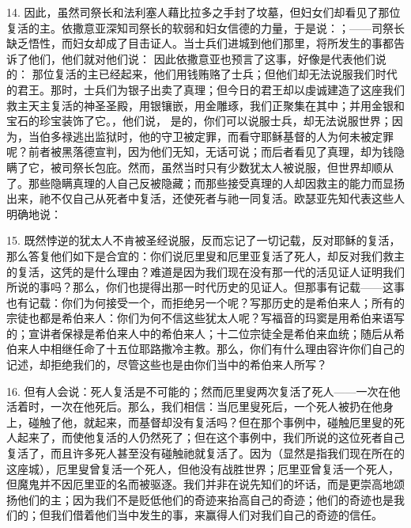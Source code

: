 14. 因此，虽然司祭长和法利塞人藉比拉多之手封了坟墓，但妇女们却看见了那位复活的主。依撒意亚深知司祭长的软弱和妇女信德的力量，于是说：；——司祭长缺乏悟性，而妇女却成了目击证人。当士兵们进城到他们那里，将所发生的事都告诉了他们，他们就对他们说： 因此依撒意亚也预言了这事，好像是代表他们说的： 那位复活的主已经起来，他们用钱贿赂了士兵；但他们却无法说服我们时代的君王。那时，士兵们为银子出卖了真理；但今日的君王却以虔诚建造了这座我们救主天主复活的神圣圣殿，用银镶嵌，用金雕琢，我们正聚集在其中；并用金银和宝石的珍宝装饰了它。，他们说， 是的，你们可以说服士兵，却无法说服世界；因为，当伯多禄逃出监狱时，他的守卫被定罪，而看守耶稣基督的人为何未被定罪呢？前者被黑落德宣判，因为他们无知，无话可说；而后者看见了真理，却为钱隐瞒了它，被司祭长包庇。然而，虽然当时只有少数犹太人被说服，但世界却顺从了。那些隐瞒真理的人自己反被隐藏；而那些接受真理的人却因救主的能力而显扬出来，祂不仅自己从死者中复活，还使死者与祂一同复活。欧瑟亚先知代表这些人明确地说：\par

15. 既然悖逆的犹太人不肯被圣经说服，反而忘记了一切记载，反对耶稣的复活，那么答复他们如下是合宜的：你们说厄里叟和厄里亚复活了死人，却反对我们救主的复活，这凭的是什么理由？难道是因为我们现在没有那一代的活见证人证明我们所说的事吗？那么，你们也提得出那一时代历史的见证人。但那事有记载——这事也有记载：你们为何接受一个，而拒绝另一个呢？写那历史的是希伯来人；所有的宗徒也都是希伯来人：你们为何不信这些犹太人呢？写福音的玛窦是用希伯来语写的；宣讲者保禄是希伯来人中的希伯来人；十二位宗徒全是希伯来血统；随后从希伯来人中相继任命了十五位耶路撒冷主教。那么，你们有什么理由容许你们自己的记述，却拒绝我们的，尽管这些也是由你们当中的希伯来人所写？\par

16. 但有人会说：死人复活是不可能的；然而厄里叟两次复活了死人——一次在他活着时，一次在他死后。那么，我们相信：当厄里叟死后，一个死人被扔在他身上，碰触了他，就起来，而基督却没有复活吗？但在那个事例中，碰触厄里叟的死人起来了，而使他复活的人仍然死了；但在这个事例中，我们所说的这位死者自己复活了，而且许多死人甚至没有碰触祂就复活了。因为（显然是指我们现在所在的这座城），厄里叟曾复活一个死人，但他没有战胜世界；厄里亚曾复活一个死人，但魔鬼并不因厄里亚的名而被驱逐。我们并非在说先知们的坏话，而是更崇高地颂扬他们的主；因为我们不是贬低他们的奇迹来抬高自己的奇迹；他们的奇迹也是我们的；但我们借着他们当中发生的事，来赢得人们对我们自己的奇迹的信任。\par

